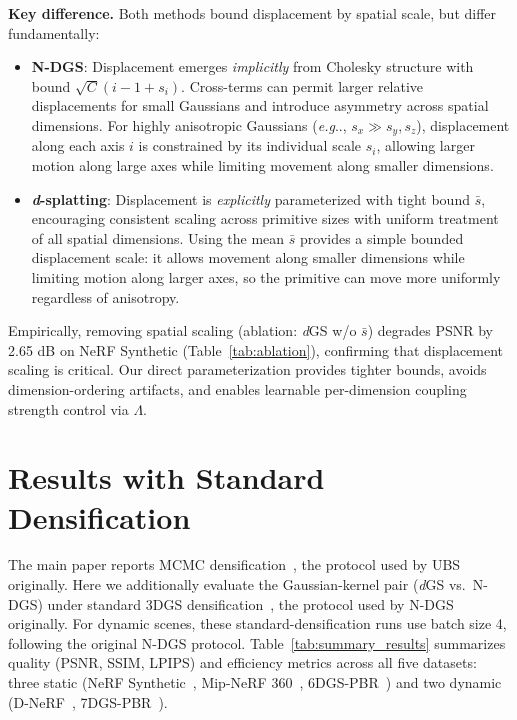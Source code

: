 \documentclass{article}
\makeatletter
\DeclareRobustCommand\onedot{\futurelet\@let@token\@onedot}
\def\@onedot{\ifx\@let@token.\else.\null\fi\xspace}
\def\eg{\emph{e.g}\onedot} \def\Eg{\emph{E.g}\onedot}
\newcommand{\dgs}{\textit{d}GS\xspace}
\newcommand{\dfamily}{\textit{d}-splatting\xspace}
\theoremstyle{plain}
\theoremstyle{definition}
\theoremstyle{remark}
\makeatother
\begin{document}
\textbf{Key difference.} Both methods bound displacement by spatial scale, but differ fundamentally:
\begin{itemize}[leftmargin=*]
\item \textbf{N-DGS}: Displacement emerges \textit{implicitly} from Cholesky structure with bound $\sqrt{C}(i-1 + s_i)$. Cross-terms can permit larger relative displacements for small Gaussians and introduce asymmetry across spatial dimensions. For highly anisotropic Gaussians (\eg, $s_x \gg s_y, s_z$), displacement along each axis $i$ is constrained by its individual scale $s_i$, allowing larger motion along large axes while limiting movement along smaller dimensions.
\item \textbf{\dfamily{}}: Displacement is \textit{explicitly} parameterized with tight bound $\bar{s}$, encouraging consistent scaling across primitive sizes with uniform treatment of all spatial dimensions. Using the mean $\bar{s}$ provides a simple bounded displacement scale: it allows movement along smaller dimensions while limiting motion along larger axes, so the primitive can move more uniformly regardless of anisotropy.
\end{itemize}

Empirically, removing spatial scaling (ablation: \textit{d}GS w/o $\bar{s}$) degrades PSNR by 2.65 dB on NeRF Synthetic (Table~\ref{tab:ablation}), confirming that displacement scaling is critical. Our direct parameterization provides tighter bounds, avoids dimension-ordering artifacts, and enables learnable per-dimension coupling strength control via $\Lambda$.


\section{Results with Standard Densification}
\label{sec:detailed_results}

The main paper reports MCMC densification~\citep{kheradmand20243dgaussiansplattingmarkov}, the protocol used by UBS originally. Here we additionally evaluate the Gaussian-kernel pair (\dgs{} vs.\ N-DGS) under standard 3DGS densification~\citep{3dgs}, the protocol used by N-DGS originally. For dynamic scenes, these standard-densification runs use batch size 4, following the original N-DGS protocol. Table~\ref{tab:summary_results} summarizes quality (PSNR, SSIM, LPIPS) and efficiency metrics across all five datasets: three static (NeRF Synthetic~\citep{mildenhall2021nerf}, Mip-NeRF 360~\citep{barron2021mipnerf}, 6DGS-PBR~\citep{gao20246dgs}) and two dynamic (D-NeRF~\citep{pumarola2020dnerfneuralradiancefields}, 7DGS-PBR~\citep{gao20257dgs}).
\end{document}
